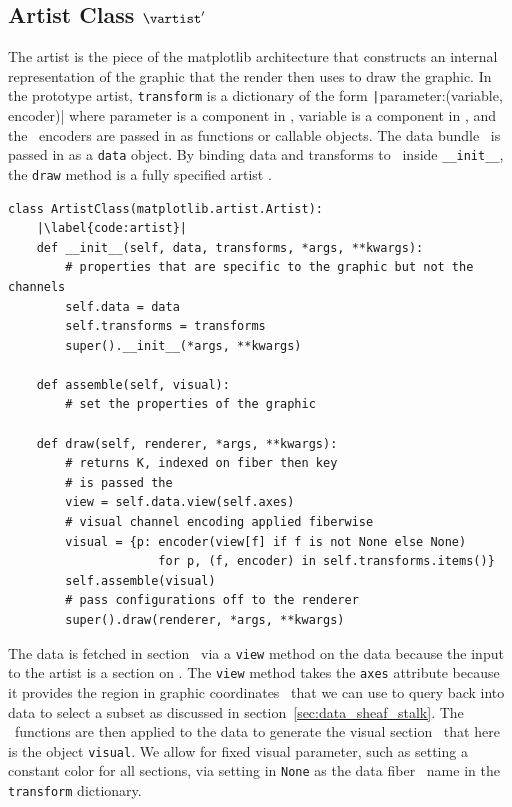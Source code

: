 \documentclass[../main.tex]{subfiles}
\begin{document}
\subsection{Artist Class $\vartist^{\prime}$}
\label{sec:code_artist}
The artist is the piece of the matplotlib architecture that constructs an internal representation of the graphic that the render then uses to draw the graphic. In the prototype artist, \texttt{transform} is a dictionary of the form \texttt|{parameter:(variable, encoder)}| where parameter is a component in \vfiber, variable is a component in \dfiber,  and the \vchannel\ encoders are passed in as functions or callable objects. The data bundle \dtotal\ is passed in as a \texttt{data} object. By binding data and transforms to \vartisteq\ inside \texttt{__init__}, the \texttt{draw} method is a fully specified artist \vartist.

\begin{verbatim}
class ArtistClass(matplotlib.artist.Artist):
    |\label{code:artist}|
    def __init__(self, data, transforms, *args, **kwargs):
        # properties that are specific to the graphic but not the channels
        self.data = data 
        self.transforms = transforms
        super().__init__(*args, **kwargs)

    def assemble(self, visual):
        # set the properties of the graphic

    def draw(self, renderer, *args, **kwargs):
        # returns K, indexed on fiber then key 
        # is passed the 
        view = self.data.view(self.axes) 
        # visual channel encoding applied fiberwise 
        visual = {p: encoder(view[f] if f is not None else None) 
                     for p, (f, encoder) in self.transforms.items()}
        self.assemble(visual)
        # pass configurations off to the renderer
        super().draw(renderer, *args, **kwargs)
\end{verbatim}

The data is fetched in section \dsection\ via a \texttt{view} method on the data because the input to the artist is a section on \dtotal. The \texttt{view} method takes the \texttt{axes} attribute because it provides the region in graphic coordinates \gbase\ that we can use to query back into data to select a subset as discussed in section~\ref{sec:data_sheaf_stalk}. The \vchannel\ functions are then applied to the data to generate the visual section \vsection\ that here is the object \texttt{visual}. We allow for fixed visual parameter, such as setting a constant color for all sections, via setting in \texttt{None} as the data fiber \dfiber\ name in the \texttt{transform} dictionary. 
\end{document}
